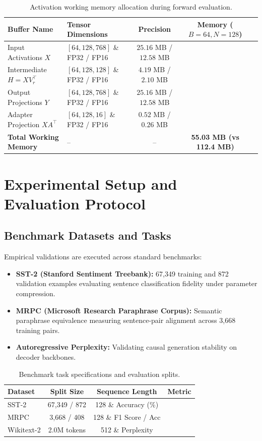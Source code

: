 \begin{table}[H]
\centering
\small
\begin{tabularx}{\linewidth}{llccc}
\toprule
\textbf{Buffer Name} & \textbf{Tensor Dimensions} & \textbf{Precision} & \textbf{Memory ($B=64, N=128$)} \\
\midrule
Input Activations $X$ & $[64, 128, 768]$ \& FP32 / FP16 & $25.16$ MB / $12.58$ MB \\
Intermediate $H = X V_r^\top$ & $[64, 128, 128]$ \& FP32 / FP16 & $4.19$ MB / $2.10$ MB \\
Output Projections $Y$ & $[64, 128, 768]$ \& FP32 / FP16 & $25.16$ MB / $12.58$ MB \\
Adapter Projection $X A^\top$ & $[64, 128, 16]$ \& FP32 / FP16 & $0.52$ MB / $0.26$ MB \\
\midrule
\textbf{Total Working Memory} & -- & -- & \textbf{55.03 MB (vs 112.4 MB)} \\
\bottomrule
\end{tabularx}
\caption{Activation working memory allocation during forward evaluation.}
\end{table}


\section{Experimental Setup and Evaluation Protocol}

\subsection{Benchmark Datasets and Tasks}
Empirical validations are executed across standard benchmarks:
\begin{itemize}
\item \textbf{SST-2 (Stanford Sentiment Treebank):} 67,349 training and 872 validation examples evaluating sentence classification fidelity under parameter compression.
\item \textbf{MRPC (Microsoft Research Paraphrase Corpus):} Semantic paraphrase equivalence measuring sentence-pair alignment across 3,668 training pairs.
\item \textbf{Autoregressive Perplexity:} Validating causal generation stability on decoder backbones.
\end{itemize}

\begin{table}[H]
\centering
\small
\begin{tabularx}{\linewidth}{lccc}
\toprule
\textbf{Dataset} & \textbf{Split Size} & \textbf{Sequence Length} & \textbf{Metric} \\
\midrule
SST-2 & 67,349 / 872 & 128 \& Accuracy (\%) \\
MRPC & 3,668 / 408 & 128 \& F1 Score / Acc \\
Wikitext-2 & 2.0M tokens & 512 \& Perplexity \\
\bottomrule
\end{tabularx}
\caption{Benchmark task specifications and evaluation splits.}
\label{tab:task_specs}
\end{table}


